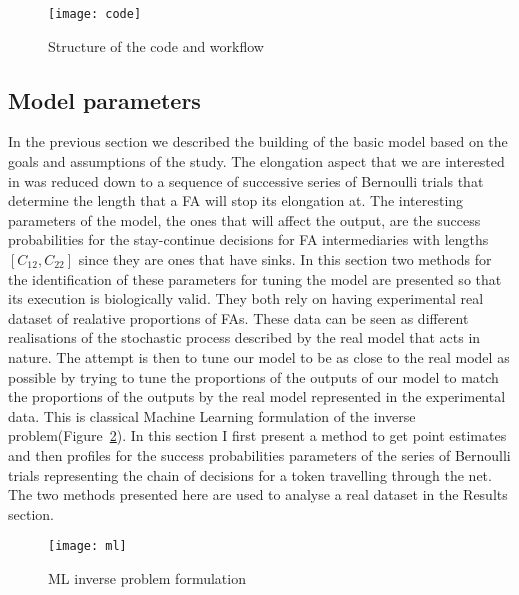 \begin{figure}[htbp!]
\centering
\texttt{[image: code]}
\caption[Workflow]{Structure of the code and workflow}
\label{fig:code}
\end{figure}


\subsection{Model parameters}
In the previous section we described the building of the basic model
based on the goals and assumptions of the study. The elongation aspect
that we are interested in was reduced down to a sequence of successive
series of Bernoulli trials that determine the length that a FA will
stop its elongation at. The interesting parameters of the model, the
ones that will affect the output, are the success probabilities for
the stay-continue decisions for FA intermediaries with lengths
$[C_{12}, C_{22}]$ since they are ones that have sinks. In this
section two methods for the identification of these parameters for
tuning the model are presented so that its execution is biologically valid. They both rely on having experimental real dataset of
realative proportions of FAs. These data can be
seen as different realisations of the stochastic process described by
the real model that acts in nature. The attempt is then to tune our
model to be as close to the real model as possible by trying to tune
the proportions of the outputs of our model to match the proportions
of the outputs by the real model represented in the experimental
data. This is  classical Machine Learning formulation of the inverse
problem(Figure~\ref{fig:ml}). In this section I first present a method to get point
estimates and then profiles for the success probabilities parameters of the series of Bernoulli
trials representing the chain of decisions for a token travelling
through the net. The two methods presented here are used to analyse a
real dataset in the Results section.

\begin{figure}[htbp!]
\centering
\texttt{[image: ml]}
\caption[ML inverse problem formulation]{ML inverse problem formulation}
\label{fig:ml}
\end{figure}



